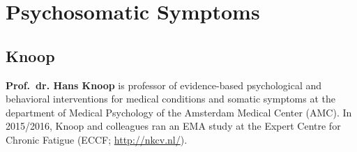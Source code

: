 \documentclass[]{book}
\begin{document}
\section{Psychosomatic Symptoms}\label{psychosomatic-symptoms}

\subsection{Knoop}\label{knoop}

 

\textbf{Prof.~dr. Hans Knoop} is professor of evidence-based
psychological and behavioral interventions for medical conditions and
somatic symptoms at the department of Medical Psychology of the
Amsterdam Medical Center (AMC). In 2015/2016, Knoop and colleagues ran
an EMA study at the Expert Centre for Chronic Fatigue (ECCF;
\url{http://nkcv.nl/}).
\end{document}
